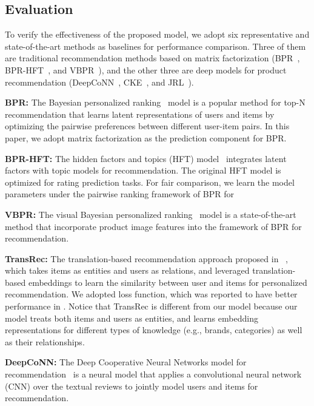 \documentclass[algorithms,article,accept,moreauthors,pdftex,10pt,a4paper]{Definitions/mdpi}
\begin{document}
\subsection{Evaluation}

To verify the effectiveness of the proposed model, we adopt six representative and state-of-the-art methods as baselines for performance comparison. 
Three of them are traditional recommendation methods based on matrix factorization (BPR~\cite{bpr}, BPR-HFT~\cite{mcauley2013hidden}, and VBPR~\cite{he2016vbpr}), and the other three are deep models for product recommendation (DeepCoNN~\cite{zheng2017joint}, CKE~\cite{zhang2016collaborativekdd}, and JRL~\cite{zhang2017joint}). 

\vspace{6 pt} \textbf{BPR: } The Bayesian personalized ranking~\cite{bpr} model is a popular method for top-N recommendation that learns latent representations of users and items by optimizing the pairwise preferences between different user-item pairs. 
In this paper, we adopt matrix factorization as the prediction component for BPR.

\textbf{BPR-HFT: } The hidden factors and topics (HFT) model~\cite{mcauley2013hidden} integrates latent factors with topic models for recommendation.
The original HFT model is optimized for rating prediction tasks.
For fair comparison, we learn the model parameters under the pairwise ranking framework of BPR for 

\textbf{VBPR: } The visual Bayesian personalized ranking~\cite{he2016vbpr} model is a state-of-the-art method that incorporate product image features into the framework of BPR for recommendation.

\textbf{TransRec: } The translation-based recommendation approach proposed in ~\cite{he2017translation}, which takes items as entities and users as relations, and leveraged translation-based embeddings to learn the similarity between user and items for personalized recommendation. We adopted  loss function, which was reported to have better performance in \cite{he2017translation}. 
Notice that TransRec is different from our model because our model treats both items and users as entities, and learns embedding representations for different types of knowledge (e.g., brands, categories) as well as their relationships. 

\textbf{DeepCoNN: } The Deep Cooperative Neural Networks model for recommendation~\cite{zheng2017joint} is a neural model that applies a convolutional neural network (CNN) over the textual reviews to jointly model users and items for recommendation.
\end{document}
